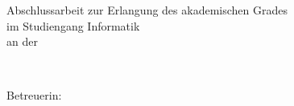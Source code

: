 \begin{titlepage}
	\vspace{2em}
	\begin{center}
	\ifdefined\graduation%
	\if\graduation\empty%
	\else%
	\textsf{Abschlussarbeit zur Erlangung des akademischen Grades}\\[0.5cm]
	\textsf{\graduation} \textsf{im Studiengang Informatik}\\[0.5cm]
	\textsf{an der \institution}\\[0.5cm]
	\textsf{\subinstitution}
	\fi
	\end{center}
	
	\vspace*{\fill}

 	\enlargethispage{1\baselineskip}
	\hrulefill\\
	\begin{center}
		\textsf{Betreuerin: \\  \supervisor}
	\end{center}
	
	\vspace*{\fill}
	
	
	\enlargethispage{4\baselineskip}
	\begin{minipage}[b]{0mm}
	\end{minipage}
	
	
\end{titlepage}
